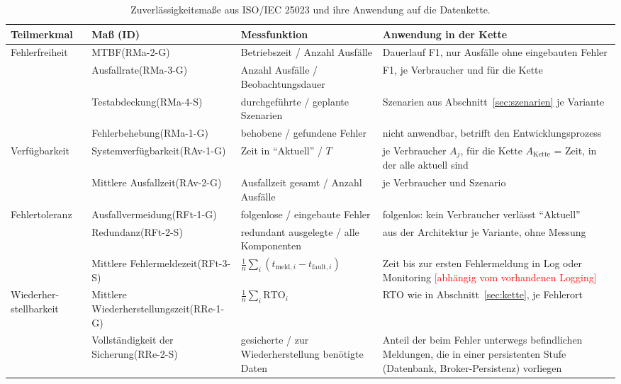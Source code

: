 \documentclass[11pt, a4paper]{article}
\newcommand{\offen}[1]{\textcolor{red}{[#1]}}
\begin{document}
\begin{table}[htbp]
\centering
\small
\begin{tabularx}{\textwidth}{@{}p{2.5cm} p{3.3cm} p{4.1cm} X@{}}
\toprule
\textbf{Teilmerkmal} & \textbf{Maß (ID)} & \textbf{Messfunktion} & \textbf{Anwendung in der Kette} \\
\midrule
Fehlerfreiheit & MTBF\newline (RMa-2-G) & Betriebszeit / Anzahl Ausfälle & Dauerlauf F1, nur Ausfälle ohne eingebauten Fehler \\
 & Ausfallrate\newline (RMa-3-G) & Anzahl Ausfälle / Beobachtungsdauer & F1, je Verbraucher und für die Kette \\
 & Testabdeckung\newline (RMa-4-S) & durchgeführte / geplante Szenarien & Szenarien aus Abschnitt~\ref{sec:szenarien} je Variante \\
 & Fehlerbehebung\newline (RMa-1-G) & behobene / gefundene Fehler & nicht anwendbar, betrifft den Entwicklungsprozess \\
\addlinespace
Verfügbarkeit & Systemverfügbarkeit\newline (RAv-1-G) & Zeit in \enquote{Aktuell} / $T$ & je Verbraucher $A_j$, für die Kette $A_{\text{Kette}}$ = Zeit, in der alle aktuell sind \\
 & Mittlere Ausfallzeit\newline (RAv-2-G) & Ausfallzeit gesamt / Anzahl Ausfälle & je Verbraucher und Szenario \\
\addlinespace
Fehlertoleranz & Ausfallvermeidung\newline (RFt-1-G) & folgenlose / eingebaute Fehler & folgenlos: kein Verbraucher verlässt \enquote{Aktuell} \\
 & Redundanz\newline (RFt-2-S) & redundant ausgelegte / alle Komponenten & aus der Architektur je Variante, ohne Messung \\
 & Mittlere Fehlermeldezeit\newline (RFt-3-S) & $\frac{1}{n}\sum_i (t_{\text{meld},i} - t_{\text{fault},i})$ & Zeit bis zur ersten Fehlermeldung in Log oder Monitoring \offen{abhängig vom vorhandenen Logging} \\
\addlinespace
Wiederher-\newline stellbarkeit & Mittlere Wiederherstellungszeit\newline (RRe-1-G) & $\frac{1}{n}\sum_i \text{RTO}_i$ & RTO wie in Abschnitt~\ref{sec:kette}, je Fehlerort \\
 & Vollständigkeit der Sicherung\newline (RRe-2-S) & gesicherte / zur Wiederherstellung benötigte Daten & Anteil der beim Fehler unterwegs befindlichen Meldungen, die in einer persistenten Stufe (Datenbank, Broker-Persistenz) vorliegen \\
\bottomrule
\end{tabularx}
\caption{Zuverlässigkeitsmaße aus ISO/IEC 25023 und ihre Anwendung auf die Datenkette.}
\label{tab:iso25023}
\end{table}
\end{document}
